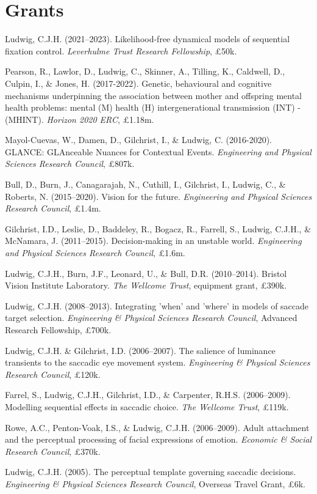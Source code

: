 \documentclass[a4paper, 10pt]{article}
\renewenvironment{itemize}{
  \begin{list}{}{
    \setlength{\leftmargin}{1.5em}
  }
}{
  \end{list}
}
\begin{document}
\section*{Grants}
\begin{itemize}
\item Ludwig, C.J.H. (2021--2023). Likelihood-free dynamical models of sequential fixation control. \textit{Leverhulme Trust Research Fellowship}, \pounds50k.
\item Pearson, R., Lawlor, D., Ludwig, C., Skinner, A., Tilling, K., Caldwell, D., Culpin, I., \& Jones, H. (2017-2022). Genetic, behavioural and cognitive mechanisms underpinning the association between mother and offspring mental health problems: mental (M) health (H) intergenerational transmission (INT) -(MHINT). \textit{Horizon 2020 ERC}, \pounds1.18m.
\item Mayol-Cuevas, W., Damen, D., Gilchrist, I., \& Ludwig, C. (2016-2020). GLANCE: GLAnceable Nuances for Contextual Events. \textit{Engineering and Physical Sciences Research Council}, \pounds807k.
\item Bull, D., Burn, J., Canagarajah, N., Cuthill, I., Gilchrist, I., Ludwig, C., \& Roberts, N. (2015--2020). Vision for the future. \textit{Engineering and Physical Sciences Research Council}, \pounds1.4m.
\item Gilchrist, I.D., Leslie, D., Baddeley, R., Bogacz, R., Farrell, S., Ludwig, C.J.H., \& McNamara, J. (2011--2015). Decision-making in an unstable world. {\it Engineering and Physical Sciences Research Council}, \pounds1.6m.
\item Ludwig, C.J.H., Burn, J.F., Leonard, U., \& Bull, D.R. (2010--2014). Bristol Vision Institute Laboratory. {\it The Wellcome Trust}, equipment grant, \pounds390k.
\item Ludwig, C.J.H. (2008--2013). Integrating 'when' and 'where' in models of saccade target selection. {\it Engineering \& Physical Sciences Research Council}, Advanced Research Fellowship, \pounds700k.
\item Ludwig, C.J.H. \& Gilchrist, I.D. (2006--2007). The salience of luminance transients to the saccadic eye movement system. {\it Engineering \& Physical Sciences Research Council}, \pounds120k.
\item Farrel, S., Ludwig, C.J.H., Gilchrist, I.D., \& Carpenter, R.H.S. (2006--2009). Modelling sequential effects in saccadic choice. {\it The Wellcome Trust}, \pounds119k.
\item Rowe, A.C., Penton-Voak, I.S., \& Ludwig, C.J.H. (2006--2009). Adult attachment and the perceptual processing of facial expressions of emotion. {\it Economic \& Social Research Council}, \pounds370k.
\item Ludwig, C.J.H. (2005). The perceptual template governing saccadic decisions. {\it Engineering \& Physical Sciences Research Council}, Overseas Travel Grant, \pounds6k.
\end{itemize}
\end{document}
